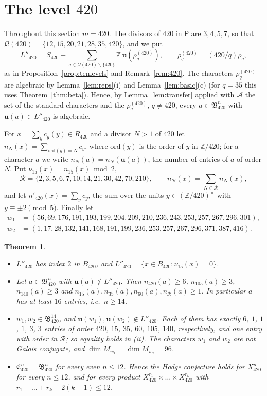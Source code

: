 \documentclass[11pt]{amsart}
\newtheorem{theorem}{Theorem}[section]
\theoremstyle{definition}
\theoremstyle{remark}
\numberwithin{equation}{section}
\newcommand{\Z}{\mathbb{Z}}
\newcommand{\fB}{\mathfrak{B}}
\newcommand{\fC}{\mathfrak{C}}
\newcommand{\cR}{\mathcal{R}}
\newcommand{\cQ}{\mathcal{Q}}
\newcommand{\sP}{\mathsf{P}}
\newcommand{\uu}{\mathbf{u}}
\newcommand{\sm}{\smallsetminus}
\begin{document}
\section{\texorpdfstring{The level $420$}{The level 420}}\label{sec:420}

Throughout this section $m=420$. The divisors of $420$ in $\sP$ are $3,4,5,7$, so that $\cQ(420)=\{12,15,20,21,28,35,420\}$, and we put
\[
L''_{420}=S_{420}+\sum_{q\in\cQ(420)\sm\{420\}}\Z\,\uu(\rho^{(420)}_q),\qquad \rho^{(420)}_q=(420/q)\rho_q,
\]
as in Proposition~\ref{prop:tenlevels} and Remark~\ref{rem:420}. The characters $\rho^{(420)}_q$ are algebraic by Lemma~\ref{lem:reps}(i) and Lemma~\ref{lem:basic}(c) (for $q=35$ this uses Theorem~\ref{thm:beta}). Hence, by Lemma~\ref{lem:transfer} applied with $\mathcal A$ the set of the standard characters and the $\rho^{(420)}_q$, $q\ne420$, every $a\in\fB^n_{420}$ with $\uu(a)\in L''_{420}$ is algebraic.

For $x=\sum_yc_y(y)\in R_{420}$ and a divisor $N>1$ of $420$ let $n_N(x)=\sum_{\mathrm{ord}(y)=N}c_y$, where $\mathrm{ord}(y)$ is the order of $y$ in $\Z/420$; for a character $a$ we write $n_N(a)=n_N(\uu(a))$, the number of entries of $a$ of order $N$. Put $\nu_{15}(x)=n_{15}(x)\bmod 2$,
\[
\cR=\{2,3,5,6,7,10,14,21,30,42,70,210\},\qquad n_\cR(x)=\sum_{N\in\cR}n_N(x),
\]
and let $n'_{420}(x)=\sum_yc_y$, the sum over the units $y\in(\Z/420)^\times$ with $y\equiv\pm2\pmod5$. Finally let
\[
\begin{aligned}
w_1&=(56,69,176,191,193,199,204,209,210,236,243,253,257,267,296,301),\\
w_2&=(1,17,28,132,141,168,191,199,236,253,257,267,296,371,387,416).
\end{aligned}
\]

\begin{theorem}\label{thm:420}
\begin{itemize}
\item[(i)] $L''_{420}$ has index $2$ in $B_{420}$, and $L''_{420}=\{x\in B_{420}:\nu_{15}(x)=0\}$.
\item[(ii)] Let $a\in\fB^n_{420}$ with $\uu(a)\notin L''_{420}$. Then $n_{420}(a)\ge6$, $n_{105}(a)\ge3$, $n_{140}(a)\ge3$ and $n_{15}(a),n_{35}(a),n_{60}(a),n_\cR(a)\ge1$. In particular $a$ has at least $16$ entries, i.e.\ $n\ge14$.
\item[(iii)] $w_1,w_2\in\fB^{14}_{420}$, and $\uu(w_1),\uu(w_2)\notin L''_{420}$. Each of them has exactly $6$, $1$, $1$, $1$, $3$, $3$ entries of order $420$, $15$, $35$, $60$, $105$, $140$, respectively, and one entry with order in $\cR$; so equality holds in {\rm(ii)}. The characters $w_1$ and $w_2$ are not Galois conjugate, and $\dim M_{w_1}=\dim M_{w_2}=96$.
\item[(iv)] $\fC^n_{420}=\fB^n_{420}$ for every even $n\le12$. Hence the Hodge conjecture holds for $X^n_{420}$ for every $n\le12$, and for every product $X^{r_1}_{420}\times\dots\times X^{r_k}_{420}$ with $r_1+\dots+r_k+2(k-1)\le12$.
\end{itemize}
\end{theorem}
\end{document}
